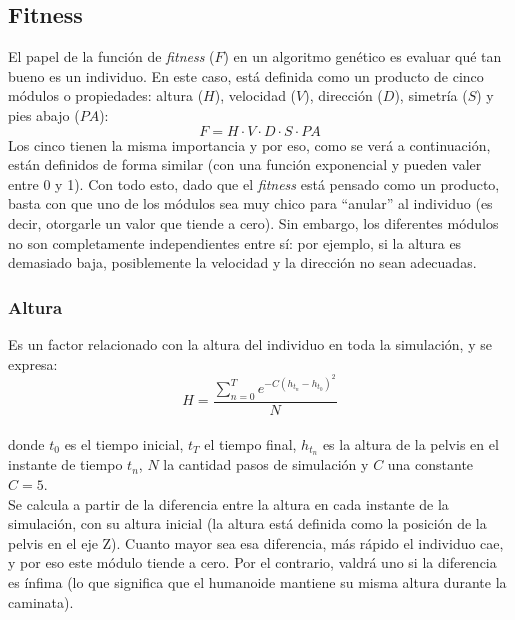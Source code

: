 \documentclass{article}
\begin{document}
\subsection{Fitness}

El papel de la funci\'on de \textit{fitness} ($F$) en un algoritmo gen\'etico es evaluar qu\'e tan bueno es un individuo. En este caso, est\'a definida como un producto de cinco m\'odulos o propiedades: altura ($H$), velocidad ($V$), direcci\'on ($D$), simetr\'ia ($S$) y pies abajo ($PA$):
\begin{equation}
  F = H \cdot V \cdot D \cdot S \cdot PA
\end{equation}
Los cinco tienen la misma importancia y por eso, como se ver\'a a continuaci\'on, est\'an definidos de forma similar (con una funci\'on exponencial y pueden valer entre 0 y 1). Con todo esto, dado que el \textit{fitness} est\'a pensado como un producto, basta con que uno de los m\'odulos sea muy chico para  ``anular'' al individuo (es decir, otorgarle un valor que tiende a cero). Sin embargo, los diferentes m\'odulos no son completamente independientes entre s\'i: por ejemplo, si la altura es demasiado baja, posiblemente la velocidad y la direcci\'on no sean adecuadas. 

\subsubsection{Altura}
\label{altura}
Es un factor relacionado con la altura del individuo en toda la simulaci\'on, y se expresa:\\
\begin{equation}
  H = \frac{\sum_{n=0}^{T} {e^{-C( h_{t_{n}} - h_{t_{0}} )^2  }}}{N}
\end{equation}
\\ donde $t_{0}$ es el tiempo inicial, $t_{T}$ el tiempo final, $h_{t_{n}}$ es la altura de la pelvis en el instante de tiempo $t_{n}$, $N$ la cantidad pasos de simulaci\'on y $C$ una constante $C=5$.
\\
Se calcula a partir de la diferencia entre la altura en cada instante de la simulaci\'on, con su altura inicial (la altura est\'a definida como la posici\'on de la pelvis en el eje Z). Cuanto mayor sea esa diferencia, m\'as r\'apido el individuo cae, y por eso este m\'odulo tiende a cero. Por el contrario, valdr\'a uno si la diferencia es \'infima (lo que significa que el humanoide mantiene su misma altura durante la caminata).
\end{document}

